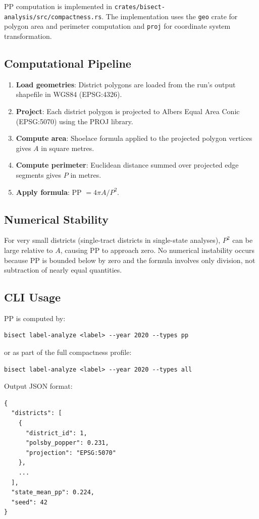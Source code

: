 PP computation is implemented in \texttt{crates/bisect-analysis/src/compactness.rs}.
The implementation uses the \texttt{geo} crate for polygon area and perimeter
computation and \texttt{proj} for coordinate system transformation.

\subsection{Computational Pipeline}

\begin{enumerate}
  \item \textbf{Load geometries}: District polygons are loaded from the run's
    output shapefile in WGS84 (EPSG:4326).
  \item \textbf{Project}: Each district polygon is projected to Albers Equal Area
    Conic (EPSG:5070) using the PROJ library.
  \item \textbf{Compute area}: Shoelace formula applied to the projected polygon
    vertices gives $A$ in square metres.
  \item \textbf{Compute perimeter}: Euclidean distance summed over projected edge
    segments gives $P$ in metres.
  \item \textbf{Apply formula}: PP $= 4\pi A / P^2$.
\end{enumerate}

\subsection{Numerical Stability}

For very small districts (single-tract districts in single-state analyses),
$P^2$ can be large relative to $A$, causing PP to approach zero.
No numerical instability occurs because PP is bounded below by zero and
the formula involves only division, not subtraction of nearly equal quantities.

\subsection{CLI Usage}

PP is computed by:
\begin{verbatim}
bisect label-analyze <label> --year 2020 --types pp
\end{verbatim}
or as part of the full compactness profile:
\begin{verbatim}
bisect label-analyze <label> --year 2020 --types all
\end{verbatim}
Output JSON format:
\begin{verbatim}
{
  "districts": [
    {
      "district_id": 1,
      "polsby_popper": 0.231,
      "projection": "EPSG:5070"
    },
    ...
  ],
  "state_mean_pp": 0.224,
  "seed": 42
}
\end{verbatim}

